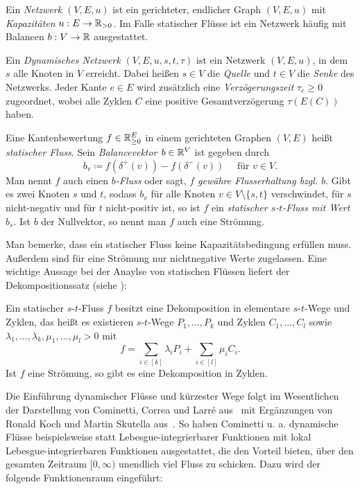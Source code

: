 \begin{definition}
	Ein \emph{Netzwerk $(V, E, u)$} ist ein gerichteter, endlicher Graph $(V, E, u)$ mit \emph{Kapazitäten} $u: E \to \mathbb{R}_{>0}$.
	Im Falle statischer Flüsse ist ein Netzwerk häufig mit Balancen $b:V\to\mathbb{R}$ ausgestattet.
	
	Ein \emph{Dynamisches Netzwerk} $(V, E, u, s, t, \tau)$ ist ein Netzwerk $(V, E, u)$, in dem $s$ alle Knoten in $V$ erreicht.
	Dabei heißen $s\in V$ die \emph{Quelle} und $t\in V$ die \emph{Senke} des Netzwerks.
	Jeder Kante $e\in E$ wird zusätzlich eine \emph{Verzögerungszeit} $\tau_e\geq 0$ zugeordnet, wobei alle Zyklen $C$ eine positive Gesamtverzögerung $\tau(E(C))$ haben.
\end{definition}
\begin{definition}
	Eine Kantenbewertung $f\in\mathbb{R}_{\geq 0}^E$ in einem gerichteten Graphen $(V, E)$ heißt \emph{statischer Fluss}.
	Sein \emph{Balancevektor $b\in \mathbb{R}^V$} ist gegeben durch
	\[ b_v \coloneq f(\delta^+(v)) - f(\delta^-(v)) \text{~~~ für $v\in V$}. \]
	Man nennt $f$ auch einen \emph{$b$-Fluss} oder sagt, \emph{$f$ gewähre Flusserhaltung bzgl. $b$}.
	Gibt es zwei Knoten $s$ und $t$, sodass $b_v$
	für alle Knoten $v\in V\setminus\{ s, t \}$ verschwindet, für $s$ nicht-negativ und für $t$ nicht-positiv ist, so ist $f$ ein \emph{statischer $s$-$t$-Fluss mit Wert $b_s$}.
	Ist $b$ der Nullvektor, so nennt man $f$ auch eine Strömung.
\end{definition}

Man bemerke, dass ein statischer Fluss keine Kapazitätsbedingung erfüllen muss.
Außerdem sind für eine Strömung nur nichtnegative Werte zugelassen.
Eine wichtige Aussage bei der Anaylse von statischen Flüssen liefert der Dekompositionssatz (siehe \cite[Satz 8.8]{Korte2012}):
\begin{theorem}[Dekompositionssatz]\label{thm-decomposition}
	Ein statischer $s$-$t$-Fluss $f$ besitzt eine Dekomposition in elementare $s$-$t$-Wege und Zyklen, das heißt es existieren $s$-$t$-Wege $P_1,\dots,P_k$ und Zyklen $C_1, \dots, C_l$ sowie $\lambda_1,\dots,\lambda_k,\mu_1,\dots,\mu_l > 0$ mit \[
		f = \sum_{i\in[k]}\lambda_i P_i + \sum_{i\in[l]} \mu_i C_i.
	\]
	Ist $f$ eine Strömung, so gibt es eine Dekomposition in Zyklen.
\end{theorem}

Die Einführung dynamischer Flüsse und kürzester Wege folgt im Wesentlichen der Darstellung von Cominetti, Correa und Larré aus~\cite{Cominetti2015} mit Ergänzungen von Ronald Koch und Martin Skutella aus~\cite{Koch2011}.
So haben Cominetti u. a. dynamische Flüsse beispielsweise statt Lebesgue-integrierbarer Funktionen mit lokal Lebesgue-integrierbaren Funktionen ausgestattet, die den Vorteil bieten, über den gesamten Zeitraum $[0, \infty)$ unendlich viel Fluss zu schicken.
Dazu wird der folgende Funktionenraum eingeführt:

